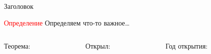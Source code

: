 \documentclass[10pt, hideallsubsections]{beamer}
\begin{document}
    \begin{frame}[fragile]{Заголовок} %

        \begin{block}{\textcolor{red}{Определение}} %
            Определяем что-то важное\dots
        \end{block}

        \begin{columns}
            \begin{column}{40pt} %
                Теорема:
            \end{column}
            \begin{column}{40pt} %
                Открыл:
            \end{column}
            \begin{column}{3cm} %
                Год открытия:
            \end{column}
        \end{columns}
    \end{frame}
\end{document}
